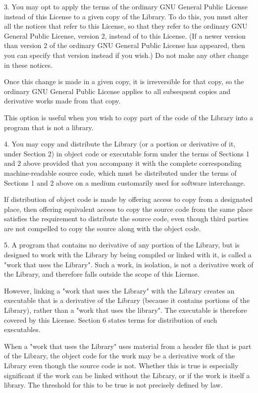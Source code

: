 \begin{DoxyVerb}
3. You may opt to apply the terms of the ordinary GNU General Public License instead of this License
to a given copy of the Library. To do this, you must alter all the notices that refer to this
License, so that they refer to the ordinary GNU General Public License, version 2, instead of to
this License. (If a newer version than version 2 of the ordinary GNU General Public License has
appeared, then you can specify that version instead if you wish.) Do not make any other change in
these notices.

Once this change is made in a given copy, it is irreversible for that copy, so the ordinary GNU
General Public License applies to all subsequent copies and derivative works made from that copy.

This option is useful when you wish to copy part of the code of the Library into a program that is
not a library.

4. You may copy and distribute the Library (or a portion or derivative of it, under Section 2) in
object code or executable form under the terms of Sections 1 and 2 above provided that you accompany
it with the complete corresponding machine-readable source code, which must be distributed under the
terms of Sections 1 and 2 above on a medium customarily used for software interchange.

If distribution of object code is made by offering access to copy from a designated place, then
offering equivalent access to copy the source code from the same place satisfies the requirement to
distribute the source code, even though third parties are not compelled to copy the source along
with the object code.

5. A program that contains no derivative of any portion of the Library, but is designed to work with
the Library by being compiled or linked with it, is called a "work that uses the Library". Such a
work, in isolation, is not a derivative work of the Library, and therefore falls outside the scope
of this License.

However, linking a "work that uses the Library" with the Library creates an executable that is a
derivative of the Library (because it contains portions of the Library), rather than a "work that
uses the library". The executable is therefore covered by this License. Section 6 states terms for
distribution of such executables.

When a "work that uses the Library" uses material from a header file that is part of the Library,
the object code for the work may be a derivative work of the Library even though the source code is
not. Whether this is true is especially significant if the work can be linked without the Library,
or if the work is itself a library. The threshold for this to be true is not precisely defined by
law.


\end{DoxyVerb}
